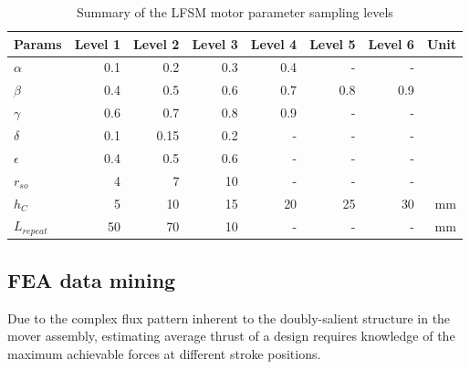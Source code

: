             
            \begin{table}[!ht]
                \renewcommand{\arraystretch}{1.2}
                \caption{Summary of the \acs{LFSM} motor parameter sampling levels}
                \label{table:chap/rsm/LFSM/sampling levels}
                \centering
                \begin{tabular}{@{}l r r r r r r r@{}}
                \hline
                \bfseries Params & \bfseries Level 1 & \bfseries Level 2 & \bfseries Level 3 & \bfseries Level 4 & \bfseries Level 5 & \bfseries Level 6 & \bfseries Unit \\
                \hline
                    $\alpha$     & 0.1     & 0.2  & 0.3 & 0.4 & -   & -   &               \\
                    $\beta$      & 0.4     & 0.5  & 0.6 & 0.7 & 0.8 & 0.9 &               \\
                    $\gamma$     & 0.6     & 0.7  & 0.8 & 0.9 & -   & -   &               \\
                    $\delta$     & 0.1     & 0.15 & 0.2 & -   & -   & -   &               \\
                    $\epsilon$   & 0.4     & 0.5  & 0.6 & -   & -   & -   &               \\
                    $r_{so}$     & 4       & 7    & 10  & -   & -   & -   &               \\
                    $h_C$        & 5       & 10   & 15  & 20  & 25  & 30  & $\mathrm{mm}$ \\
                    $L_{repeat}$ & 50      & 70   & 10  & -   & -   & -   & $\mathrm{mm}$
                    \\
                \hline
                \end{tabular}
            \end{table}
                    
        
        \subsection{\acs{FEA} data mining}          \label{Chapter:RSM/LFSM/data mining}
        
        
            Due to the complex flux pattern inherent to the doubly-salient structure in the mover assembly, estimating average thrust of a design requires knowledge of the maximum achievable forces at different stroke positions.

